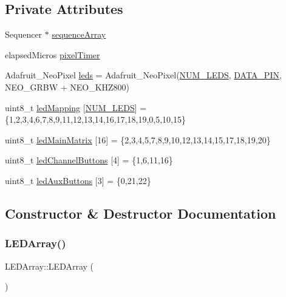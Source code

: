 \subsection*{Private Attributes}
\begin{DoxyCompactItemize}
\item 
Sequencer $\ast$ \hyperlink{class_l_e_d_array_a93c18ec03393f639c7e0a11a3324c922}{sequence\+Array}
\item 
elapsed\+Micros \hyperlink{class_l_e_d_array_a72681582a31026c79a8021cead72d51e}{pixel\+Timer}
\item 
Adafruit\+\_\+\+Neo\+Pixel \hyperlink{class_l_e_d_array_ae781b0d4364e6789f618e9d73fe69198}{leds} = Adafruit\+\_\+\+Neo\+Pixel(\hyperlink{_l_e_d_array_8h_a4c4ae9a4146ce8d6a5debc90300d9abd}{N\+U\+M\+\_\+\+L\+E\+DS}, \hyperlink{_l_e_d_array_8h_adad67fe595ea440c8f8247ec2cddf070}{D\+A\+T\+A\+\_\+\+P\+IN}, N\+E\+O\+\_\+\+G\+R\+BW + N\+E\+O\+\_\+\+K\+H\+Z800)
\item 
uint8\+\_\+t \hyperlink{class_l_e_d_array_a9a675b5ebd4e5b0034ef944f204871fe}{led\+Mapping} \mbox{[}\hyperlink{_l_e_d_array_8h_a4c4ae9a4146ce8d6a5debc90300d9abd}{N\+U\+M\+\_\+\+L\+E\+DS}\mbox{]} = \{1,2,3,4,6,7,8,9,11,12,13,14,16,17,18,19,0,5,10,15\}
\item 
uint8\+\_\+t \hyperlink{class_l_e_d_array_add6bd6e431a7e4a8b7e33c96b0bf7578}{led\+Main\+Matrix} \mbox{[}16\mbox{]} = \{2,3,4,5,7,8,9,10,12,13,14,15,17,18,19,20\}
\item 
uint8\+\_\+t \hyperlink{class_l_e_d_array_a64d8cc06323de69ccad888f63a231c5f}{led\+Channel\+Buttons} \mbox{[}4\mbox{]} = \{1,6,11,16\}
\item 
uint8\+\_\+t \hyperlink{class_l_e_d_array_a22ca5391b4ad6c8b7b44e3aaf73c9429}{led\+Aux\+Buttons} \mbox{[}3\mbox{]} = \{0,21,22\}
\end{DoxyCompactItemize}


\subsection{Constructor \& Destructor Documentation}
\mbox{\label{class_l_e_d_array_a38e049928e05c44035bf47ed888c319f}} 
\subsubsection{\texorpdfstring{L\+E\+D\+Array()}{LEDArray()}}
{\footnotesize\ttfamily L\+E\+D\+Array\+::\+L\+E\+D\+Array (\begin{DoxyParamCaption}{ }\end{DoxyParamCaption})}




